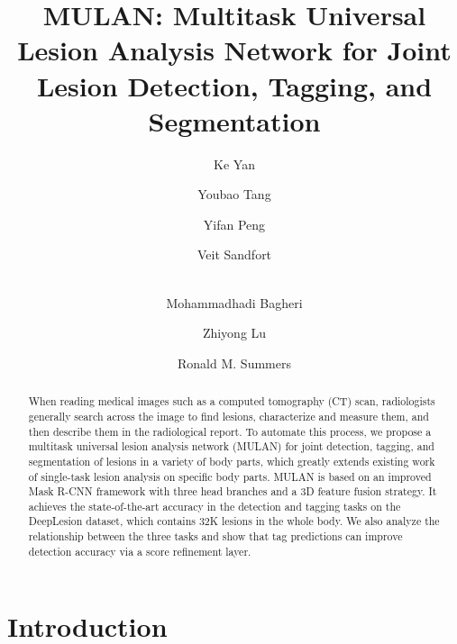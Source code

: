 \documentclass[runningheads]{llncs}
\begin{document}
\title{MULAN: Multitask Universal Lesion Analysis Network for Joint Lesion Detection, Tagging, and Segmentation}
\author{Ke Yan \and Youbao Tang \and Yifan Peng \and Veit Sandfort \and \\ Mohammadhadi Bagheri \and Zhiyong Lu \and Ronald M. Summers}




\maketitle              \begin{abstract}


When reading medical images such as a computed tomography (CT) scan, radiologists generally search across the image to find lesions, characterize and measure them, and then describe them in the radiological report. To automate this process, we propose a multitask universal lesion analysis network (MULAN) for joint detection, tagging, and segmentation of lesions in a variety of body parts,
which greatly extends existing work of single-task lesion analysis on specific body parts. MULAN is based on an improved Mask R-CNN framework with three head branches and a 3D feature fusion strategy. It achieves the state-of-the-art accuracy in the detection and tagging tasks on the DeepLesion dataset, which contains 32K lesions in the whole body. We also analyze the relationship between the three tasks and show that tag predictions can improve detection accuracy via a score refinement layer.

\end{abstract}

\section{Introduction}
\end{document}
